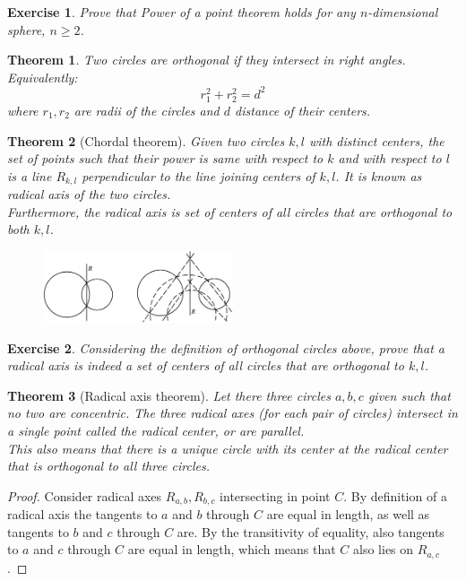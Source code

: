 \documentclass[11pt,a5paper]{article}
\newtheorem{exercise}{Exercise}
\newtheorem*{Theorem}{Theorem}
\begin{document}
\begin{exercise}
Prove that Power of a point theorem holds for any $n$-dimensional sphere, $n \ge 2$.
\end{exercise}

\begin{Theorem}
Two circles are orthogonal if they intersect in right angles. Equivalently: \[r_1^2 + r_2^2 = d^2\] where $r_1, r_2$ are radii of the circles and $d$ distance of their centers.
\end{Theorem}

\begin{Theorem}[Chordal theorem]
Given two circles $k, l$ with distinct centers, the set of points such that their power is same with respect to $k$ and with respect to $l$ is a line $R_{k, l}$ perpendicular to the line joining centers of $k, l$. It is known as \emph{radical axis} of the two circles. \\
Furthermore, the radical axis is set of centers of all circles that are orthogonal to both $k, l$.
\end{Theorem}

\begin{figure}[h] \begin{center}
\includegraphics[width=0.5\textwidth]{radical}
\end{center} \end{figure}

\begin{exercise}
Considering the definition of orthogonal circles above, prove that a radical axis is indeed a set of centers of all circles that are orthogonal to $k, l$.
\end{exercise}


\begin{Theorem}[Radical axis theorem]
Let there three circles $a,b,c$ given such that no two are concentric. The three radical axes (for each pair of circles) intersect in a single point called the \emph{radical center}, or are parallel. \\
This also means that there is a unique circle with its center at the radical center that is orthogonal to all three circles. 
\end{Theorem}

\begin{proof}
Consider radical axes $R_{a,b}, R_{b,c}$ intersecting in point $C$. By definition of a radical axis the tangents to $a$ and $b$ through $C$ are equal in length, as well as tangents to $b$ and $c$ through $C$ are. By the transitivity of equality, also tangents to $a$ and $c$ through $C$ are equal in length, which means that $C$ also lies on $R_{a,c}$.
\end{proof}
\end{document}
